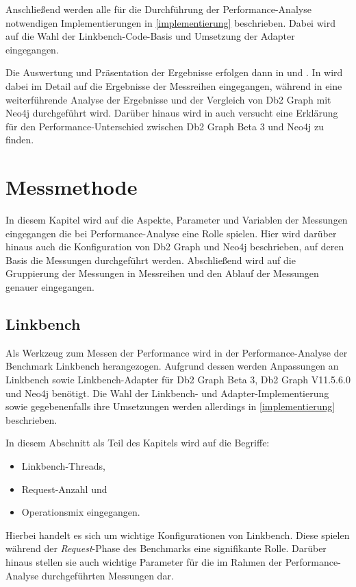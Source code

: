 Anschließend werden alle für die Durchführung der Performance-Analyse notwendigen Implementierungen in \autoref{implementierung} beschrieben. Dabei wird auf die Wahl der Linkbench-Code-Basis und Umsetzung der Adapter eingegangen. 

Die Auswertung und Präsentation der Ergebnisse erfolgen dann in  und . In  wird dabei im Detail auf die Ergebnisse der Messreihen eingegangen, während in  eine weiterführende Analyse der Ergebnisse und der Vergleich von Db2 Graph mit Neo4j durchgeführt wird. Darüber hinaus wird in  auch versucht eine Erklärung für den Performance-Unterschied zwischen Db2 Graph Beta 3 und Neo4j zu finden. 

\chapter{Messmethode}
\label{messmethode}
In diesem Kapitel wird auf die Aspekte, Parameter und Variablen der Messungen eingegangen die bei Performance-Analyse eine Rolle spielen. Hier wird darüber hinaus auch die Konfiguration von Db2 Graph und Neo4j beschrieben, auf deren Basis die Messungen durchgeführt werden. Abschließend wird auf die Gruppierung der Messungen in Messreihen und den Ablauf der Messungen genauer eingegangen.  

\section{Linkbench}
Als Werkzeug zum Messen der Performance wird in der Performance-Analyse der Benchmark Linkbench herangezogen. Aufgrund dessen werden Anpassungen an Linkbench  sowie Linkbench-Adapter für Db2 Graph Beta 3, Db2 Graph V11.5.6.0 und Neo4j benötigt. Die Wahl der Linkbench- und Adapter-Implementierung sowie gegebenenfalls ihre Umsetzungen werden allerdings in \autoref{implementierung} beschrieben. 

In diesem Abschnitt als Teil des Kapitels  wird auf die Begriffe: 
\begin{itemize}
    \item Linkbench-Threads,
    \item Request-Anzahl und
    \item Operationsmix eingegangen.
\end{itemize}
Hierbei handelt es sich um wichtige Konfigurationen von Linkbench. Diese spielen während der \textit{Request}-Phase des Benchmarks eine signifikante Rolle. Darüber hinaus stellen sie auch wichtige Parameter für die im Rahmen der Performance-Analyse durchgeführten Messungen dar. 

